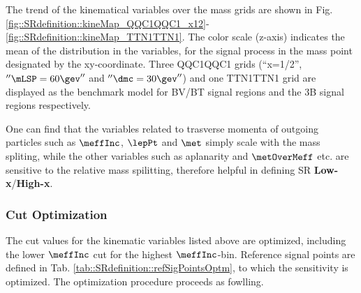 The trend of the kinematical variables over the mass grids are shown in Fig. \ref{fig::SRdefinition::kineMap_QQC1QQC1_x12}-\ref{fig::SRdefinition::kineMap_TTN1TTN1}. The color scale (z-axis) indicates the mean of the distribution in the variables, for the signal process in the mass point designated by the xy-coordinate. Three QQC1QQC1 grids (``x=1/2'', $''\mLSP=60\gev''$ and $''\dmc=30\gev''$) and one TTN1TTN1 grid are displayed as the benchmark model for BV/BT signal regions and the 3B signal regions respectively. 

One can find that the variables related to trasverse momenta of outgoing particles such as $\meffInc$, $\lepPt$ and $\met$ simply scale with the mass spliting, while the other variables such as aplanarity and $\metOverMeff$ etc. are sensitive to the relative mass spilitting, therefore helpful in defining SR \textbf{Low-x}/\textbf{High-x}.
\clearpage
 


\clearpage		
\subsubsection{Cut Optimization}
The cut values for the kinematic variables listed above are optimized, including the lower $\meffInc$ cut for the highest $\meffInc$-bin. Reference signal points are defined in Tab. \ref{tab::SRdefinition::refSigPointsOptm}, to which the sensitivity is optimized. The optimization procedure proceeds as fowlling.

